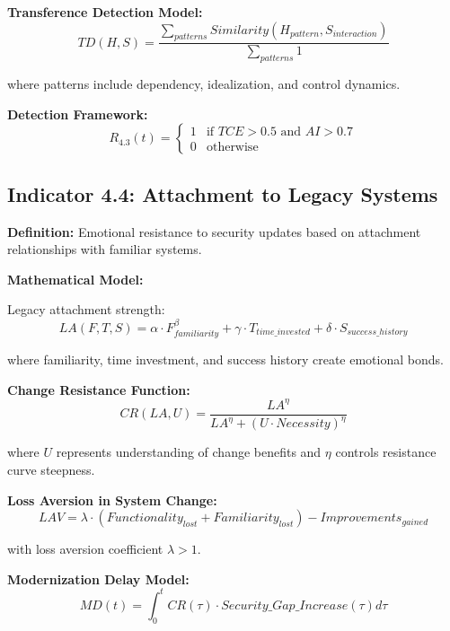 \documentclass[11pt,a4paper]{article}
\begin{document}
\textbf{Transference Detection Model:}
\begin{equation}
TD(H,S) = \frac{\sum_{patterns} Similarity(H_{pattern}, S_{interaction})}{\sum_{patterns} 1}
\end{equation}

where patterns include dependency, idealization, and control dynamics.

\textbf{Detection Framework:}
\begin{equation}
R_{4.3}(t) = \begin{cases}
1 & \text{if } TCE > 0.5 \text{ and } AI > 0.7 \\
0 & \text{otherwise}
\end{cases}
\end{equation}

\subsection{Indicator 4.4: Attachment to Legacy Systems}

\textbf{Definition:} Emotional resistance to security updates based on attachment relationships with familiar systems.

\textbf{Mathematical Model:}

Legacy attachment strength:
\begin{equation}
LA(F,T,S) = \alpha \cdot F_{familiarity}^{\beta} + \gamma \cdot T_{time\_invested} + \delta \cdot S_{success\_history}
\end{equation}

where familiarity, time investment, and success history create emotional bonds.

\textbf{Change Resistance Function:}
\begin{equation}
CR(LA,U) = \frac{LA^{\eta}}{LA^{\eta} + (U \cdot Necessity)^{\eta}}
\end{equation}

where $U$ represents understanding of change benefits and $\eta$ controls resistance curve steepness.

\textbf{Loss Aversion in System Change:}
\begin{equation}
LAV = \lambda \cdot (Functionality_{lost} + Familiarity_{lost}) - Improvements_{gained}
\end{equation}

with loss aversion coefficient $\lambda > 1$.

\textbf{Modernization Delay Model:}
\begin{equation}
MD(t) = \int_0^t CR(\tau) \cdot Security\_Gap\_Increase(\tau) d\tau
\end{equation}
\end{document}
